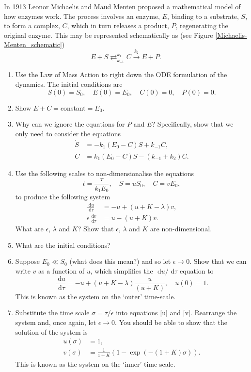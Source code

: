 \documentclass[]{article}
\newcommand{\bb}{\begin{equation}}
\newcommand{\ee}{\end{equation}}
\newcommand{\rd}{\text{ d}}
\newcommand{\see}[1]{(see Figure \ref{#1})}
\newcommand{\eqns}[2]{equations \eqref{#1} and \eqref{#2}}
\renewcommand{\l}{\left(}
\renewcommand{\r}{\right)}
\begin{document}
In 1913 Leonor Michaelis and Maud Menten proposed a mathematical model of how enzymes work. The process involves an enzyme, $E$, binding to a substrate, $S$, to form a complex, $C$, which in turn releases a product, $P$, regenerating the original enzyme. This may be represented schematically as \see{Michaelis-Menten_schematic}
\bb
E+S\mathrel{\mathop{\rightleftarrows}^{k_1}_{k_{-1}}}C\stackrel{k_2}{\rightarrow}E+P.
\ee
\begin{enumerate}
\item Use the Law of Mass Action to right down the ODE formulation of the dynamics. The initial conditions are
\bb
S(0) = S_0,\quad E(0) = E_0,\quad C(0) = 0,\quad P(0) = 0.
\ee
\item Show $E+C=$constant$=E_0$.
\item Why can we ignore the equations for $\dot{P}$ and $\dot{E}$? Specifically, show that we only need to consider the equations
\begin{align}
\dot{S}&=-k_1(E_0-C)S + k_{-1}C,\\
\dot{C}&=k_1(E_0-C)S -( k_{-1}+k_2)C.
\end{align}
\item Use the following scales to non-dimensionalise the equations
\bb
t=\frac{\tau}{k_1E_0},\quad S=u S_0,\quad C=v E_0,
\ee
to produce the following system
\begin{align}
\frac{\rd u}{\rd \tau}&=-u+(u+K-\lambda)v,\label{u}\\
\epsilon\frac{\rd v}{\rd \tau}&=u-(u+K)v\label{v}.
\end{align}
What are $\epsilon$, $\lambda$ and $K$? Show that $\epsilon$, $\lambda$ and $K$ are non-dimensional.
\item What are the initial conditions?
\item Suppose $E_0\ll S_0$ (what does this mean?) and so let $\epsilon\rightarrow0$. Show that we can write $v$ as a function of $u$, which simplifies the $\rd u/\rd \tau$ equation to
\bb
\frac{\rd u}{\rd \tau}=-u+(u+K-\lambda)\frac{u}{(u+K)}, \quad u(0)=1.
\ee \label{Outer}
This is known as the system on the `outer' time-scale.
\item \label{Inner} Substitute the time scale $\sigma=\tau/\epsilon$ into \eqns{u}{v}. Rearrange the system and, once again, let $\epsilon \rightarrow 0$. You should be able to show that the solution of the system is
\begin{align}
u(\sigma)&=1,\nonumber\\
v(\sigma)&= \frac{1}{1+K}\l 1-\exp(-(1+K)\sigma)\r.
\end{align}
This is known as the system on the `inner' time-scale.
\end{enumerate}
\end{document}
